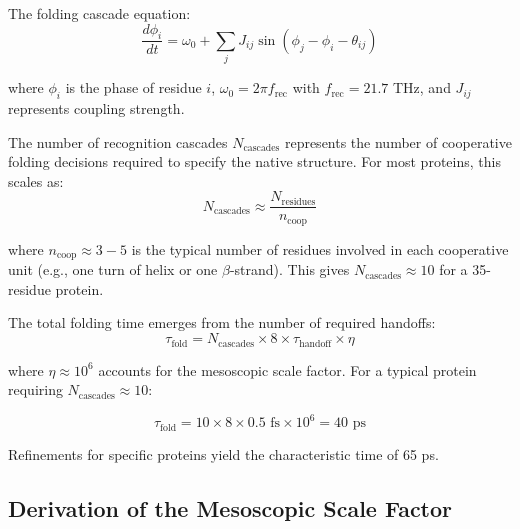 \documentclass[12pt,twocolumn]{article}
\begin{document}
The folding cascade equation:
\begin{equation}
\frac{d\phi_i}{dt} = \omega_0 + \sum_j J_{ij} \sin(\phi_j - \phi_i - \theta_{ij})
\end{equation}

where $\phi_i$ is the phase of residue $i$, $\omega_0 = 2\pi f_{\text{rec}}$ with $f_{\text{rec}} = 21.7$ THz, and $J_{ij}$ represents coupling strength.

The number of recognition cascades $N_{\text{cascades}}$ represents the number of cooperative folding decisions required to specify the native structure. For most proteins, this scales as:
\begin{equation}
N_{\text{cascades}} \approx \frac{N_{\text{residues}}}{n_{\text{coop}}}
\end{equation}

where $n_{\text{coop}} \approx 3-5$ is the typical number of residues involved in each cooperative unit (e.g., one turn of helix or one $\beta$-strand). This gives $N_{\text{cascades}} \approx 10$ for a 35-residue protein.

The total folding time emerges from the number of required handoffs:
\begin{equation}
\tau_{\text{fold}} = N_{\text{cascades}} \times 8 \times \tau_{\text{handoff}} \times \eta
\end{equation}

where $\eta \approx 10^6$ accounts for the mesoscopic scale factor. For a typical protein requiring $N_{\text{cascades}} \approx 10$:

\begin{equation}
\tau_{\text{fold}} = 10 \times 8 \times 0.5 \text{ fs} \times 10^6 = 40 \text{ ps}
\end{equation}

Refinements for specific proteins yield the characteristic time of 65 ps.

\subsection{Derivation of the Mesoscopic Scale Factor}
\end{document}
